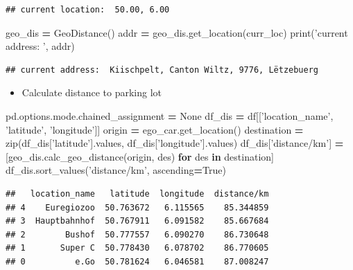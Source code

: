 \documentclass[]{book}
\newenvironment{Shaded}{\begin{snugshade}}{\end{snugshade}}
\newcommand{\BuiltInTok}[1]{#1}
\newcommand{\ControlFlowTok}[1]{\textcolor[rgb]{0.13,0.29,0.53}{\textbf{#1}}}
\newcommand{\KeywordTok}[1]{\textcolor[rgb]{0.13,0.29,0.53}{\textbf{#1}}}
\newcommand{\NormalTok}[1]{#1}
\newcommand{\OperatorTok}[1]{\textcolor[rgb]{0.81,0.36,0.00}{\textbf{#1}}}
\newcommand{\StringTok}[1]{\textcolor[rgb]{0.31,0.60,0.02}{#1}}
\newcommand{\VariableTok}[1]{\textcolor[rgb]{0.00,0.00,0.00}{#1}}
\providecommand{\tightlist}{%
  \setlength{\itemsep}{0pt}\setlength{\parskip}{0pt}}
\begin{document}
\begin{verbatim}
## current location:  50.00, 6.00
\end{verbatim}

\begin{Shaded}
\begin{Highlighting}[]
\NormalTok{geo_dis }\OperatorTok{=}\NormalTok{ GeoDistance()}
\NormalTok{addr }\OperatorTok{=}\NormalTok{ geo_dis.get_location(curr_loc)}
\BuiltInTok{print}\NormalTok{(}\StringTok{'current address: '}\NormalTok{, addr)}
\end{Highlighting}
\end{Shaded}

\begin{verbatim}
## current address:  Kiischpelt, Canton Wiltz, 9776, Lëtzebuerg
\end{verbatim}

\begin{itemize}
\tightlist
\item
  Calculate distance to parking lot
\end{itemize}

\begin{Shaded}
\begin{Highlighting}[]
\NormalTok{pd.options.mode.chained_assignment }\OperatorTok{=} \VariableTok{None}
\NormalTok{df_dis }\OperatorTok{=}\NormalTok{ df[[}\StringTok{'location_name'}\NormalTok{, }\StringTok{'latitude'}\NormalTok{, }\StringTok{'longitude'}\NormalTok{]]}
\NormalTok{origin }\OperatorTok{=}\NormalTok{ ego_car.get_location()}
\NormalTok{destination }\OperatorTok{=} \BuiltInTok{zip}\NormalTok{(df_dis[}\StringTok{'latitude'}\NormalTok{].values, df_dis[}\StringTok{'longitude'}\NormalTok{].values)}
\NormalTok{df_dis[}\StringTok{'distance/km'}\NormalTok{] }\OperatorTok{=}\NormalTok{ [geo_dis.calc_geo_distance(origin, des) }\ControlFlowTok{for}\NormalTok{ des }\KeywordTok{in}\NormalTok{ destination]}
\NormalTok{df_dis.sort_values(}\StringTok{'distance/km'}\NormalTok{, ascending}\OperatorTok{=}\VariableTok{True}\NormalTok{)}
\end{Highlighting}
\end{Shaded}

\begin{verbatim}
##   location_name   latitude  longitude  distance/km
## 4    Euregiozoo  50.763672   6.115565    85.344859
## 3  Hauptbahnhof  50.767911   6.091582    85.667684
## 2        Bushof  50.777557   6.090270    86.730648
## 1       Super C  50.778430   6.078702    86.770605
## 0          e.Go  50.781624   6.046581    87.008247
\end{verbatim}
\end{document}
